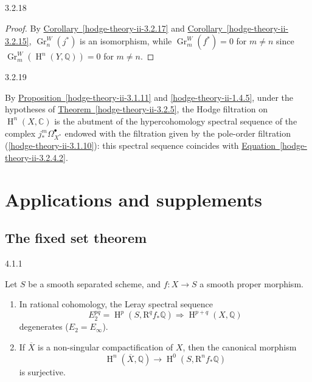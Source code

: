 \begin{corollary}{3.2.18}
\begin{proof}
      By \hyperref[hodge-theory-ii-3.2.17]{Corollary~\ref*{hodge-theory-ii-3.2.17}} and \hyperref[hodge-theory-ii-3.2.15]{Corollary~\ref*{hodge-theory-ii-3.2.15}}, \(\operatorname {Gr}_n^W(j^*)\) is an isomorphism, while \(\operatorname {Gr}_m^W(f^*)=0\) for \(m\neq  n\) since \(\operatorname {Gr}_m^W(\operatorname {H}^n(Y,\mathbb {Q}))=0\) for \(m\neq  n\).\end{proof}\end{corollary}\begin{remark}{3.2.19}\label{hodge-theory-ii-3.2.19}\skipsinglepar\par{}By \hyperref[hodge-theory-ii-3.1.11]{Proposition~\ref*{hodge-theory-ii-3.1.11}} and \cref{hodge-theory-ii-1.4.5}, under the hypotheses of \hyperref[hodge-theory-ii-3.2.5]{Theorem~\ref*{hodge-theory-ii-3.2.5}}, the Hodge filtration on \(\operatorname {H}^n(X,\mathbb {C})\) is the abutment of the hypercohomology spectral sequence of the complex \(j_*^m\Omega _{X^*}^\bullet \) endowed with the filtration given by the pole-order filtration (\cref{hodge-theory-ii-3.1.10}): this spectral sequence coincides with \hyperref[hodge-theory-ii-3.2.4.2]{Equation~\ref*{hodge-theory-ii-3.2.4.2}}.\end{remark}\chapter{Applications and supplements}\thispagestyle{fancy}\label{hodge-theory-ii-4}\section{The fixed set theorem}\label{hodge-theory-ii-4.1}\begin{theorem}{4.1.1}\label{hodge-theory-ii-4.1.1}\skipsinglepar\par{}Let \(S\) be a smooth separated scheme, and \(f\colon  X\to  S\) a smooth proper morphism.\begin{enumerate}
    
 \item[(i)]
      In rational cohomology, the Leray spectral sequence
      \[         E_2^{pq}         = \operatorname {H}^p(S,\mathrm {R}^qf_*\mathbb {Q})         \Rightarrow  \operatorname {H}^{p+q}(X,\mathbb {Q})       \]
      degenerates (\(E_2=E_\infty \)).
    


    
 \item[(ii)]
      If \(\overline {X}\) is a non-singular compactification of \(X\), then the canonical morphism
      \[         \operatorname {H}^n(\overline {X},\mathbb {Q})         \to  \operatorname {H}^0(S,\mathrm {R}^nf_*\mathbb {Q})       \]
      is surjective.
    


\end{enumerate}
\end{theorem}
